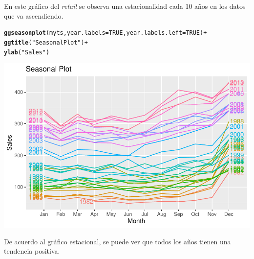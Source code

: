 \documentclass[12pt]{article}\usepackage[]{graphicx}\usepackage[]{xcolor}
\makeatletter
\def\maxwidth{ %
  \ifdim\Gin@nat@width>\linewidth
    \linewidth
  \else
    \Gin@nat@width
  \fi
}
\newcommand{\hlnum}[1]{\textcolor[rgb]{0.686,0.059,0.569}{#1}}%
\newcommand{\hlsng}[1]{\textcolor[rgb]{0.192,0.494,0.8}{#1}}%
\newcommand{\hlopt}[1]{\textcolor[rgb]{0,0,0}{#1}}%
\newcommand{\hldef}[1]{\textcolor[rgb]{0.345,0.345,0.345}{#1}}%
\newcommand{\hlkwc}[1]{\textcolor[rgb]{0.333,0.667,0.333}{#1}}%
\newcommand{\hlkwd}[1]{\textcolor[rgb]{0.737,0.353,0.396}{\textbf{#1}}}%
\newenvironment{kframe}{%
 \def\at@end@of@kframe{}%
 \ifinner\ifhmode%
  \def\at@end@of@kframe{\end{minipage}}%
  \begin{minipage}{\columnwidth}%
 \fi\fi%
 \def\FrameCommand##1{\hskip\@totalleftmargin \hskip-\fboxsep
 \colorbox{shadecolor}{##1}\hskip-\fboxsep
     \hskip-\linewidth \hskip-\@totalleftmargin \hskip\columnwidth}%
 \MakeFramed {\advance\hsize-\width
   \@totalleftmargin\z@ \linewidth\hsize
   \@setminipage}}%
 {\par\unskip\endMakeFramed%
 \at@end@of@kframe}
\newenvironment{knitrout}{}{} %
\makeatother
\begin{document}
En este gráfico del \textit{retail} se observa una estacionalidad cada 10 años en los datos que va ascendiendo.


\begin{knitrout}
\color{fgcolor}\begin{kframe}
\begin{alltt}
\hlkwd{ggseasonplot}\hldef{(myts,} \hlkwc{year.labels}\hldef{=}\hlnum{TRUE}\hldef{,} \hlkwc{year.labels.left}\hldef{=}\hlnum{TRUE}\hldef{)} \hlopt{+}
  \hlkwd{ggtitle}\hldef{(}\hlsng{"Seasonal Plot"}\hldef{)} \hlopt{+}
  \hlkwd{ylab}\hldef{(}\hlsng{"Sales"}\hldef{)}
\end{alltt}
\end{kframe}

{\centering \includegraphics[width=\maxwidth]{figure/unnamed-chunk-3-1} 

}


\end{knitrout}

De acuerdo al gráfico estacional, se puede ver que todos los años tienen una tendencia positiva.
\end{document}
